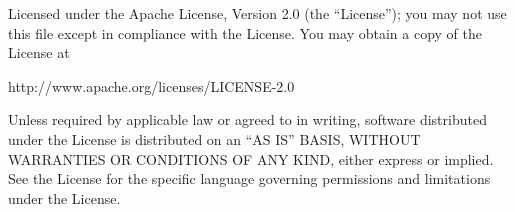 \centerline{}

Licensed under the Apache License, Version 2.0 (the ``License''); you
may not use this file except in compliance with the License.  You may
obtain a copy of the License at

       http://www.apache.org/licenses/LICENSE-2.0

Unless required by applicable law or agreed to in writing, software
distributed under the License is distributed on an ``AS IS'' BASIS,
WITHOUT WARRANTIES OR CONDITIONS OF ANY KIND, either express or
implied.  See the License for the specific language governing
permissions and limitations under the License.



